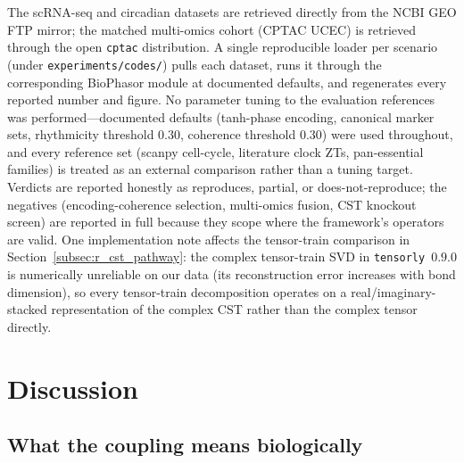 \documentclass[preprint,12pt,amsmath,amssymb,superscriptaddress,floatfix]{revtex4-2}
\begin{document}
The scRNA-seq and circadian datasets are retrieved directly from the NCBI GEO
FTP mirror; the matched multi-omics cohort (CPTAC UCEC) is retrieved through
the open \texttt{cptac} distribution. A single reproducible loader per
scenario (under \texttt{experiments/codes/}) pulls each dataset, runs it
through the corresponding BioPhasor module at documented defaults, and
regenerates every reported number and figure. No parameter tuning to the
evaluation references was performed---documented defaults (tanh-phase encoding,
canonical marker sets, rhythmicity threshold $0.30$, coherence threshold
$0.30$) were used throughout, and every reference set (scanpy cell-cycle,
literature clock ZTs, pan-essential families) is treated as an external
comparison rather than a tuning target. Verdicts are reported honestly as
reproduces, partial, or does-not-reproduce; the negatives (encoding-coherence
selection, multi-omics fusion, CST knockout screen) are reported in full
because they scope where the framework's operators are valid. One
implementation note affects the tensor-train comparison in
Section~\ref{subsec:r_cst_pathway}: the complex tensor-train SVD in
\texttt{tensorly}~$0.9.0$ is numerically unreliable on our data (its
reconstruction error increases with bond dimension), so every tensor-train
decomposition operates on a real/imaginary-stacked representation of the complex
CST rather than the complex tensor directly.


\section{Discussion}
\label{sec:discussion}

\subsection{What the coupling means biologically}
\end{document}
